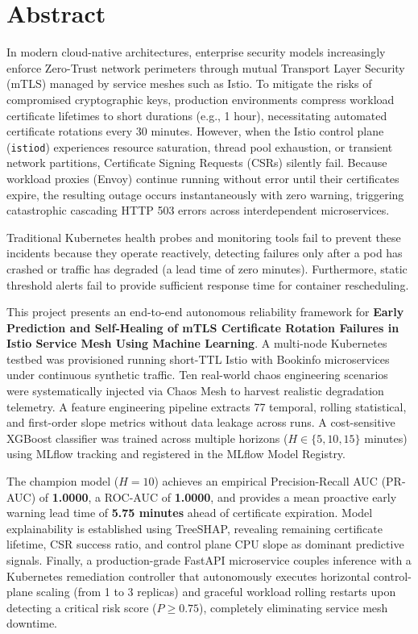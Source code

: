 \documentclass[12pt,a4paper]{report}
\begin{document}
\chapter*{Abstract}
\noindent
In modern cloud-native architectures, enterprise security models increasingly enforce Zero-Trust network perimeters through mutual Transport Layer Security (mTLS) managed by service meshes such as Istio. To mitigate the risks of compromised cryptographic keys, production environments compress workload certificate lifetimes to short durations (e.g., 1 hour), necessitating automated certificate rotations every 30 minutes. However, when the Istio control plane (\texttt{istiod}) experiences resource saturation, thread pool exhaustion, or transient network partitions, Certificate Signing Requests (CSRs) silently fail. Because workload proxies (Envoy) continue running without error until their certificates expire, the resulting outage occurs instantaneously with zero warning, triggering catastrophic cascading HTTP 503 errors across interdependent microservices.

Traditional Kubernetes health probes and monitoring tools fail to prevent these incidents because they operate reactively, detecting failures only after a pod has crashed or traffic has degraded (a lead time of zero minutes). Furthermore, static threshold alerts fail to provide sufficient response time for container rescheduling. 

This project presents an end-to-end autonomous reliability framework for \textbf{Early Prediction and Self-Healing of mTLS Certificate Rotation Failures in Istio Service Mesh Using Machine Learning}. A multi-node Kubernetes testbed was provisioned running short-TTL Istio with Bookinfo microservices under continuous synthetic traffic. Ten real-world chaos engineering scenarios were systematically injected via Chaos Mesh to harvest realistic degradation telemetry. A feature engineering pipeline extracts 77 temporal, rolling statistical, and first-order slope metrics without data leakage across runs. A cost-sensitive XGBoost classifier was trained across multiple horizons ($H \in \{5, 10, 15\}$ minutes) using MLflow tracking and registered in the MLflow Model Registry. 

The champion model ($H=10$) achieves an empirical Precision-Recall AUC (PR-AUC) of \textbf{1.0000}, a ROC-AUC of \textbf{1.0000}, and provides a mean proactive early warning lead time of \textbf{5.75 minutes} ahead of certificate expiration. Model explainability is established using TreeSHAP, revealing remaining certificate lifetime, CSR success ratio, and control plane CPU slope as dominant predictive signals. Finally, a production-grade FastAPI microservice couples inference with a Kubernetes remediation controller that autonomously executes horizontal control-plane scaling (from 1 to 3 replicas) and graceful workload rolling restarts upon detecting a critical risk score ($P \ge 0.75$), completely eliminating service mesh downtime.
\end{document}
